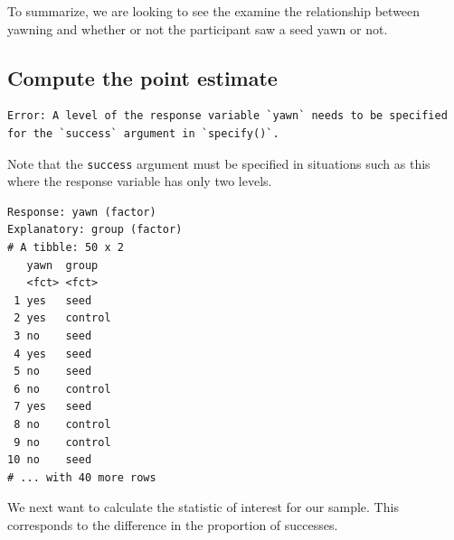 \documentclass[12pt,]{krantz}
\makeatletter
\newenvironment{Shaded}{\begin{snugshade}}{\end{snugshade}}
\newcommand{\KeywordTok}[1]{\textcolor[rgb]{0.27,0.27,0.27}{\textbf{#1}}}
\newcommand{\DataTypeTok}[1]{\textcolor[rgb]{0.27,0.27,0.27}{#1}}
\newcommand{\StringTok}[1]{\textcolor[rgb]{0.5,0.5,0.5}{#1}}
\newcommand{\OperatorTok}[1]{\textcolor[rgb]{0.43,0.43,0.43}{\textbf{#1}}}
\newcommand{\NormalTok}[1]{#1}
\newenvironment{kframe}{%
\medskip{}
\setlength{\fboxsep}{.8em}
 \def\at@end@of@kframe{}%
 \ifinner\ifhmode%
  \def\at@end@of@kframe{\end{minipage}}%
  \begin{minipage}{\columnwidth}%
 \fi\fi%
 \def\FrameCommand##1{\hskip\@totalleftmargin \hskip-\fboxsep
 \colorbox{shadecolor}{##1}\hskip-\fboxsep
     \hskip-\linewidth \hskip-\@totalleftmargin \hskip\columnwidth}%
 \MakeFramed {\advance\hsize-\width
   \@totalleftmargin\z@ \linewidth\hsize
   \@setminipage}}%
 {\par\unskip\endMakeFramed%
 \at@end@of@kframe}
\renewenvironment{Shaded}{\begin{kframe}}{\end{kframe}}
\makeatother
\begin{document}
To summarize, we are looking to see the examine the relationship between
yawning and whether or not the participant saw a seed yawn or not.

\subsection{Compute the point
estimate}\label{compute-the-point-estimate}

\begin{Shaded}
\end{Shaded}

\begin{verbatim}
Error: A level of the response variable `yawn` needs to be specified for the `success` argument in `specify()`.
\end{verbatim}

Note that the \texttt{success} argument must be specified in situations
such as this where the response variable has only two levels.

\begin{Shaded}
\end{Shaded}

\begin{verbatim}
Response: yawn (factor)
Explanatory: group (factor)
# A tibble: 50 x 2
   yawn  group  
   <fct> <fct>  
 1 yes   seed   
 2 yes   control
 3 no    seed   
 4 yes   seed   
 5 no    seed   
 6 no    control
 7 yes   seed   
 8 no    control
 9 no    control
10 no    seed   
# ... with 40 more rows
\end{verbatim}

We next want to calculate the statistic of interest for our sample. This
corresponds to the difference in the proportion of successes.

\begin{Shaded}
\end{Shaded}
\end{document}
